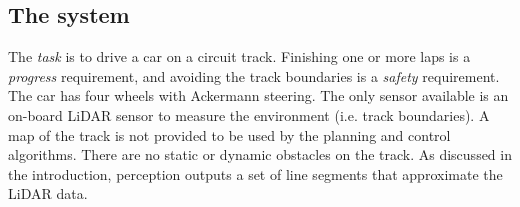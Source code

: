 \subsection{The system}
The \emph{task} is to drive a car on a circuit track.
%
Finishing one or more laps is a \emph{progress} requirement, and avoiding the track boundaries is a \emph{safety} requirement.
%
The car has four wheels with Ackermann steering.
%
The only sensor available is an on-board LiDAR sensor to measure the environment (i.e. track boundaries).
%
A map of the track is not provided to be used by the planning and control algorithms.
%
There are no static or dynamic obstacles on the track.
%
As discussed in the introduction, perception outputs a set of line segments that approximate the LiDAR data.


